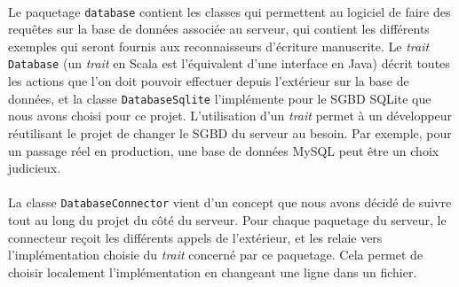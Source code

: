 \paragraph{}
Le paquetage \texttt{database} contient les classes qui permettent au logiciel de faire des requêtes sur la base de données associée au serveur, qui contient les différents exemples qui seront fournis aux reconnaisseurs d'écriture manuscrite. Le \textit{trait} \texttt{Database} (un \textit{trait} en Scala est l'équivalent d'une interface en Java) décrit toutes les actions que l'on doit pouvoir effectuer depuis l'extérieur sur la base de données, et la classe \texttt{DatabaseSqlite} l'implémente pour le SGBD SQLite que nous avons choisi pour ce projet. L'utilisation d'un \textit{trait} permet à un développeur réutilisant le projet de changer le SGBD du serveur au besoin. Par exemple, pour un passage réel en production, une base de données MySQL peut être un choix judicieux. 

\paragraph{}
La classe \texttt{DatabaseConnector} vient d'un concept que nous avons décidé de suivre tout au long du projet du côté du serveur. Pour chaque paquetage du serveur, le connecteur reçoit les différents appels de l'extérieur, et les relaie vers l'implémentation choisie du \textit{trait} concerné par ce paquetage. Cela permet de choisir localement l'implémentation en changeant une ligne dans un fichier.


